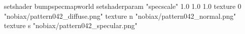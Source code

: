 setshader bumpspecmapworld
setshaderparam "specscale" 1.0 1.0 1.0
   texture 0 "nobiax/pattern042_diffuse.png"
   texture n "nobiax/pattern042_normal.png"
   texture s "nobiax/pattern042_specular.png"